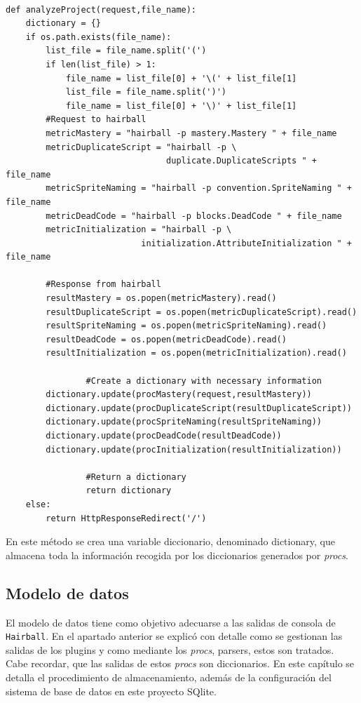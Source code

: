\documentclass[a4paper, 12pt]{book}
\begin{document}
\begingroup
\fontsize{7pt}{8pt}\selectfont
\begin{verbatim}

def analyzeProject(request,file_name):
    dictionary = {}
    if os.path.exists(file_name):
        list_file = file_name.split('(')
        if len(list_file) > 1:
            file_name = list_file[0] + '\(' + list_file[1]
            list_file = file_name.split(')')
            file_name = list_file[0] + '\)' + list_file[1]
        #Request to hairball
        metricMastery = "hairball -p mastery.Mastery " + file_name
        metricDuplicateScript = "hairball -p \
                                duplicate.DuplicateScripts " + file_name
        metricSpriteNaming = "hairball -p convention.SpriteNaming " + file_name
        metricDeadCode = "hairball -p blocks.DeadCode " + file_name 
        metricInitialization = "hairball -p \
                           initialization.AttributeInitialization " + file_name

        #Response from hairball
        resultMastery = os.popen(metricMastery).read()
        resultDuplicateScript = os.popen(metricDuplicateScript).read()
        resultSpriteNaming = os.popen(metricSpriteNaming).read()
        resultDeadCode = os.popen(metricDeadCode).read()
        resultInitialization = os.popen(metricInitialization).read()
        
				#Create a dictionary with necessary information
        dictionary.update(procMastery(request,resultMastery))
        dictionary.update(procDuplicateScript(resultDuplicateScript))
        dictionary.update(procSpriteNaming(resultSpriteNaming))
        dictionary.update(procDeadCode(resultDeadCode))
        dictionary.update(procInitialization(resultInitialization))
        
				#Return a dictionary
				return dictionary
    else:
        return HttpResponseRedirect('/')

\end{verbatim}
\endgroup

En este método se crea una variable diccionario, denominado dictionary, que almacena
toda la información recogida por los diccionarios generados por \emph{procs}. 


\subsection{Modelo de datos}

El modelo de datos tiene como objetivo adecuarse a las salidas de consola de 
\texttt{Hairball}. En el apartado anterior se explicó con detalle como se gestionan 
las salidas de los plugins y como mediante los \emph{procs}, parsers, estos son tratados.
Cabe recordar, que las salidas de estos \emph{procs} son diccionarios. En este capítulo
se detalla el procedimiento de almacenamiento, además de la configuración del sistema de 
base de datos en este proyecto SQlite. \\ 
\end{document}
